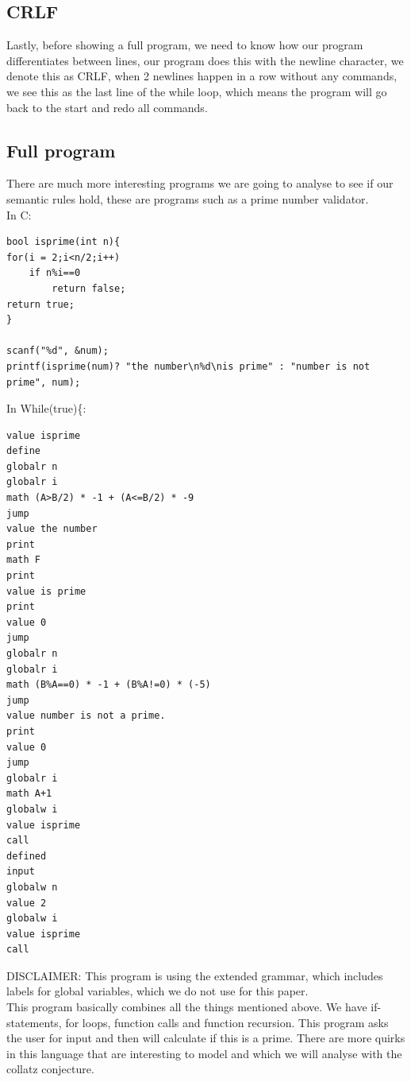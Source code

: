 \documentclass{article}
\begin{document}
\subsection{CRLF}
Lastly, before showing a full program, we need to know how our program differentiates between lines, our program does this with the newline character, we denote this as CRLF, when 2 newlines happen in a row without any commands, we see this as the last line of the while loop, which means the program will go back to the start and redo all commands.
\subsection{Full program}
There are much more interesting programs we are going to analyse to see if our semantic rules hold, these are programs such as a prime number validator. \\
In C:
\begin{verbatim}
bool isprime(int n){
for(i = 2;i<n/2;i++)
    if n%i==0
        return false;
return true;    
}

scanf("%d", &num);
printf(isprime(num)? "the number\n%d\nis prime" : "number is not prime", num);
\end{verbatim}
In While(true)\{:
\begin{verbatim}
value isprime
define
globalr n
globalr i
math (A>B/2) * -1 + (A<=B/2) * -9
jump       
value the number
print
math F
print
value is prime
print
value 0
jump
globalr n
globalr i
math (B%A==0) * -1 + (B%A!=0) * (-5)
jump
value number is not a prime.
print
value 0
jump
globalr i
math A+1
globalw i
value isprime
call
defined
input
globalw n
value 2
globalw i
value isprime
call
\end{verbatim}
DISCLAIMER: This program is using the extended grammar, which includes labels for global variables, which we do not use for this paper.\\
This program basically combines all the things mentioned above. We have if-statements, for loops, function calls and function recursion. This program asks the user for input and then will calculate if this is a prime. There are more quirks in this language that are interesting to model and which we will analyse with the collatz conjecture. \\\\

\end{document}
